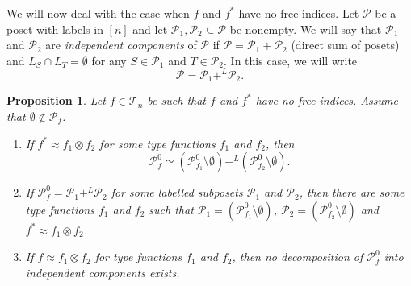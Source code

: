 \documentclass[12pt]{article}
\newtheorem{prop}{Proposition}
\theoremstyle{definition}
\theoremstyle{remark}
\def\indep{+^L}
\def\Te{\mathcal T}
\def\Pe{\mathcal P}
\begin{document}
We will now deal with the case when $f$ and $f^*$ have no free indices.
Let $\Pe$ be a poset with labels in $[n]$ and let $\Pe_1,\Pe_2\subseteq \Pe$ be nonempty. We will say that $\Pe_1$ and $\Pe_2$ are {\em independent
components} of $\Pe$ if $\Pe=\Pe_1+\Pe_2$ (direct sum of posets) and $L_S\cap L_T=\emptyset$ for 
any $S\in \Pe_1$ and $T\in \Pe_2$. In this case, we will write
\[
\Pe=\Pe_1\indep \Pe_2.
\]


\begin{prop}\label{prop:nofree_components} Let $f\in \Te_n$ be such that $f$ and  $f^*$ have no
free indices. Assume that $\emptyset \notin \Pe_{f}$. 
\begin{enumerate}
\item[(i)] If $f^*\approx f_1\otimes f_2$ for some type functions $f_1$ and
$f_2$, then 
\[
\Pe_f^0\simeq (\Pe_{f_1}^0\setminus \emptyset) \indep  (\Pe_{f_2}^0\setminus
\emptyset).
\]
\item[(ii)] If $\Pe_f^0=\Pe_1\indep \Pe_2$ for some labelled subposets $\Pe_1$ and $\Pe_2$, 
then there are some type functions $f_1$ and $f_2$ such that $\Pe_1=(\Pe_{f_1}^0\setminus
\emptyset)$, $\Pe_2=(\Pe_{f_2}^0\setminus \emptyset)$ and
$f^*\approx f_1\otimes f_2$.
\item[(iii)] If $f\approx f_1\otimes f_2$ for type functions $f_1$ and
$f_2$, then no 
decomposition of $\Pe_f^0$ into independent components exists.

\end{enumerate}

\end{prop}
\end{document}

